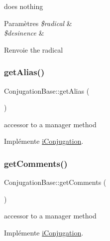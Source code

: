 does nothing


\begin{DoxyParams}{Paramètres}
{\em \$radical} & \\
\hline
{\em \$desinence} & \\
\hline
\end{DoxyParams}
\begin{DoxyReturn}{Renvoie}
the radical 
\end{DoxyReturn}
\hypertarget{classConjugationBase_ac8266b933fde0f494a7933c4d2fe0590}{}\label{classConjugationBase_ac8266b933fde0f494a7933c4d2fe0590} 
\subsubsection{\texorpdfstring{get\+Alias()}{getAlias()}}
{\footnotesize\ttfamily Conjugation\+Base\+::get\+Alias (\begin{DoxyParamCaption}{ }\end{DoxyParamCaption})}

accessor to a manager method 

Implémente \hyperlink{interfaceiConjugation_a30a8959865d6b8d3f4ae69c31792f32a}{i\+Conjugation}.

\hypertarget{classConjugationBase_ac381d5a6d6411aba279cb56e8505bb30}{}\label{classConjugationBase_ac381d5a6d6411aba279cb56e8505bb30} 
\subsubsection{\texorpdfstring{get\+Comments()}{getComments()}}
{\footnotesize\ttfamily Conjugation\+Base\+::get\+Comments (\begin{DoxyParamCaption}{ }\end{DoxyParamCaption})}

accessor to a manager method 

Implémente \hyperlink{interfaceiConjugation}{i\+Conjugation}.

\hypertarget{classConjugationBase_a4358d211e7c70a82657e5418a554a555}{}\label{classConjugationBase_a4358d211e7c70a82657e5418a554a555} 
